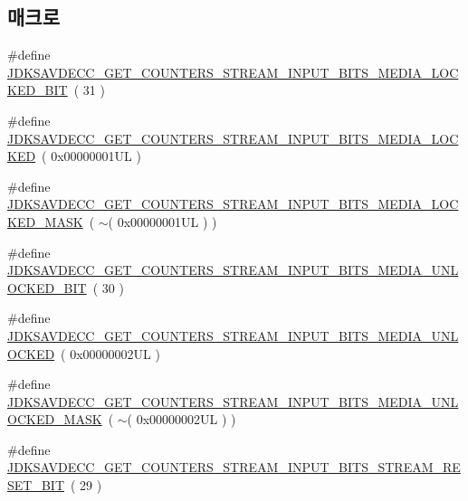 \subsection*{매크로}
\begin{DoxyCompactItemize}
\item 
\#define \hyperlink{group__get__counters__stream__input__bits_gaa678e34b153f8d107d403ae7b6fda586}{J\+D\+K\+S\+A\+V\+D\+E\+C\+C\+\_\+\+G\+E\+T\+\_\+\+C\+O\+U\+N\+T\+E\+R\+S\+\_\+\+S\+T\+R\+E\+A\+M\+\_\+\+I\+N\+P\+U\+T\+\_\+\+B\+I\+T\+S\+\_\+\+M\+E\+D\+I\+A\+\_\+\+L\+O\+C\+K\+E\+D\+\_\+\+B\+IT}~( 31 )
\item 
\#define \hyperlink{group__get__counters__stream__input__bits_ga1d4b991912628a99aeb4c03df5f29520}{J\+D\+K\+S\+A\+V\+D\+E\+C\+C\+\_\+\+G\+E\+T\+\_\+\+C\+O\+U\+N\+T\+E\+R\+S\+\_\+\+S\+T\+R\+E\+A\+M\+\_\+\+I\+N\+P\+U\+T\+\_\+\+B\+I\+T\+S\+\_\+\+M\+E\+D\+I\+A\+\_\+\+L\+O\+C\+K\+ED}~( 0x00000001\+U\+L )
\item 
\#define \hyperlink{group__get__counters__stream__input__bits_ga449c3d9afc1ae4a5c5a049aabfb0a4cb}{J\+D\+K\+S\+A\+V\+D\+E\+C\+C\+\_\+\+G\+E\+T\+\_\+\+C\+O\+U\+N\+T\+E\+R\+S\+\_\+\+S\+T\+R\+E\+A\+M\+\_\+\+I\+N\+P\+U\+T\+\_\+\+B\+I\+T\+S\+\_\+\+M\+E\+D\+I\+A\+\_\+\+L\+O\+C\+K\+E\+D\+\_\+\+M\+A\+SK}~( $\sim$( 0x00000001\+U\+L ) )
\item 
\#define \hyperlink{group__get__counters__stream__input__bits_ga078bed1655ec48cc086a0224fbc72b8e}{J\+D\+K\+S\+A\+V\+D\+E\+C\+C\+\_\+\+G\+E\+T\+\_\+\+C\+O\+U\+N\+T\+E\+R\+S\+\_\+\+S\+T\+R\+E\+A\+M\+\_\+\+I\+N\+P\+U\+T\+\_\+\+B\+I\+T\+S\+\_\+\+M\+E\+D\+I\+A\+\_\+\+U\+N\+L\+O\+C\+K\+E\+D\+\_\+\+B\+IT}~( 30 )
\item 
\#define \hyperlink{group__get__counters__stream__input__bits_ga3689f1e3b2bb6fbb39fc756b6d43c9c1}{J\+D\+K\+S\+A\+V\+D\+E\+C\+C\+\_\+\+G\+E\+T\+\_\+\+C\+O\+U\+N\+T\+E\+R\+S\+\_\+\+S\+T\+R\+E\+A\+M\+\_\+\+I\+N\+P\+U\+T\+\_\+\+B\+I\+T\+S\+\_\+\+M\+E\+D\+I\+A\+\_\+\+U\+N\+L\+O\+C\+K\+ED}~( 0x00000002\+U\+L )
\item 
\#define \hyperlink{group__get__counters__stream__input__bits_ga10ed24c550c68d1f5ef8818d659aef1a}{J\+D\+K\+S\+A\+V\+D\+E\+C\+C\+\_\+\+G\+E\+T\+\_\+\+C\+O\+U\+N\+T\+E\+R\+S\+\_\+\+S\+T\+R\+E\+A\+M\+\_\+\+I\+N\+P\+U\+T\+\_\+\+B\+I\+T\+S\+\_\+\+M\+E\+D\+I\+A\+\_\+\+U\+N\+L\+O\+C\+K\+E\+D\+\_\+\+M\+A\+SK}~( $\sim$( 0x00000002\+U\+L ) )
\item 
\#define \hyperlink{group__get__counters__stream__input__bits_ga938ac75dbe2ec7673490a14da0d0b1fc}{J\+D\+K\+S\+A\+V\+D\+E\+C\+C\+\_\+\+G\+E\+T\+\_\+\+C\+O\+U\+N\+T\+E\+R\+S\+\_\+\+S\+T\+R\+E\+A\+M\+\_\+\+I\+N\+P\+U\+T\+\_\+\+B\+I\+T\+S\+\_\+\+S\+T\+R\+E\+A\+M\+\_\+\+R\+E\+S\+E\+T\+\_\+\+B\+IT}~( 29 )

\end{DoxyCompactItemize}
